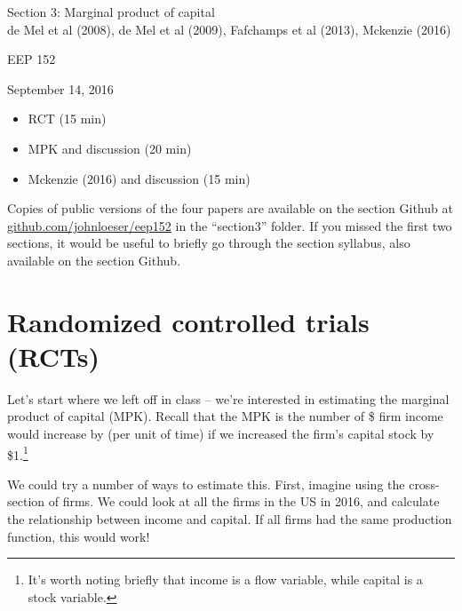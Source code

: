 \documentclass[12pt,english]{article}
\begin{document}
\begin{center}
{\Large{}Section 3: Marginal product of capital} \\
{\large{}de Mel et al (2008), de Mel et al (2009), Fafchamps et al (2013), Mckenzie (2016)}
\par\end{center}{\Large \par}

\begin{center}
EEP 152
\par\end{center}

\begin{center}
September 14, 2016
\par\end{center}

\begin{itemize}
	\setlength\itemsep{-0.5em}
	\item RCT (15 min)
	\item MPK and discussion (20 min)
	\item Mckenzie (2016) and discussion (15 min)
\end{itemize}
Copies of public versions of the four papers are available on the section Github at \href{github.com/johnloeser/eep152}{github.com/johnloeser/eep152} in the ``section3'' folder. If you missed the first two sections, it would be useful to briefly go through the section syllabus, also available on the section Github.

\section{Randomized controlled trials (RCTs)}

Let's start where we left off in class -- we're interested in estimating the marginal product of capital (MPK). Recall that the MPK is the number of \$ firm income would increase by (per unit of time) if we increased the firm's capital stock by \$1.\footnote{It's worth noting briefly that income is a flow variable, while capital is a stock variable.}

We could try a number of ways to estimate this. First, imagine using the cross-section of firms. We could look at all the firms in the US in 2016, and calculate the relationship between income and capital. If all firms had the same production function, this would work!
\end{document}
